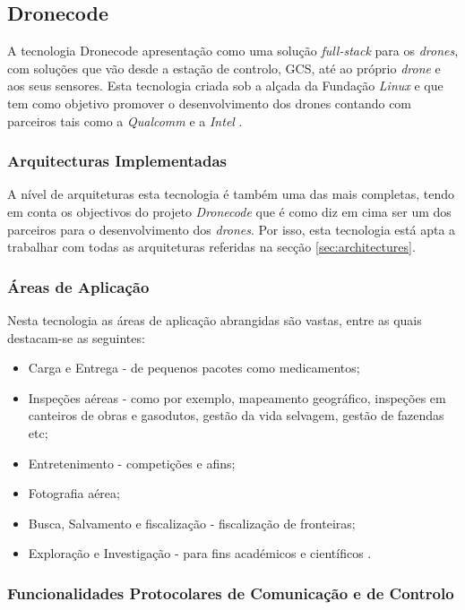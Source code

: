 \subsection{Dronecode}

A tecnologia Dronecode apresentação como uma solução \textit{full-stack} para os \textit{drones}, com soluções que vão desde a estação de controlo, GCS, até ao próprio \textit{drone} e aos seus sensores. Esta tecnologia criada sob a alçada da Fundação \textit{Linux} e que tem como objetivo promover o desenvolvimento dos drones contando com parceiros tais como a \textit{Qualcomm} e a \textit{Intel} \cite{DronecodeProject}.

\subsubsection{Arquitecturas Implementadas}

A nível de arquiteturas esta tecnologia é também uma das mais completas, tendo em conta os objectivos do projeto \textit{Dronecode} que é como diz em cima ser um dos parceiros para o desenvolvimento dos \textit{drones}. Por isso, esta tecnologia está apta a trabalhar com todas as arquiteturas referidas na secção \ref{sec:architectures}. 

\subsubsection{Áreas de Aplicação}

Nesta tecnologia as áreas de aplicação abrangidas são vastas, entre as quais destacam-se as seguintes:

\begin{itemize}
    \item Carga e Entrega - de pequenos pacotes como medicamentos;
    \item Inspeções aéreas - como por exemplo, mapeamento geográfico, inspeções em canteiros de obras e gasodutos, gestão da vida selvagem, gestão de fazendas etc;
    \item Entretenimento - competições e afins;
    \item Fotografia aérea;
    \item Busca, Salvamento e fiscalização - fiscalização de fronteiras;
    \item Exploração e Investigação - para fins académicos e científicos \cite{DronecodeProject}.
\end{itemize}

\subsubsection{Funcionalidades Protocolares de Comunicação e de Controlo}

